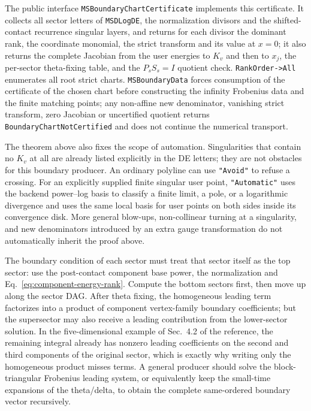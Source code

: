 \documentclass[11pt,a4paper]{article}
\begin{document}
The public interface \texttt{MSBoundaryChartCertificate} implements this certificate. It collects all sector letters of \texttt{MSDLogDE}, the normalization divisors and the shifted-contact recurrence singular layers, and returns for each divisor the dominant rank, the coordinate monomial, the strict transform and its value at $x=0$; it also returns the complete Jacobian from the user energies to $K_v$ and then to $x_j$, the per-sector theta-fixing table, and the $P_sS_s=I$ quotient check. \texttt{RankOrder->All} enumerates all root strict charts. \texttt{MSBoundaryData} forces consumption of the certificate of the chosen chart before constructing the infinity Frobenius data and the finite matching points; any non-affine new denominator, vanishing strict transform, zero Jacobian or uncertified quotient returns \texttt{BoundaryChartNotCertified} and does not continue the numerical transport.

The theorem above also fixes the scope of automation. Singularities that contain no $K_v$ at all are already listed explicitly in the DE letters; they are not obstacles for this boundary producer.  An ordinary polyline can use \texttt{"Avoid"} to refuse a crossing.  For an explicitly supplied finite singular user point, \texttt{"Automatic"} uses the backend power--log basis to classify a finite limit, a pole, or a logarithmic divergence and uses the same local basis for user points on both sides inside its convergence disk.  More general blow-ups, non-collinear turning at a singularity, and new denominators introduced by an extra gauge transformation do not automatically inherit the proof above.

The boundary condition of each sector must treat that sector itself as the top sector: use the post-contact component base power, the normalization and Eq.~\eqref{eq:component-energy-rank}. Compute the bottom sectors first, then move up along the sector DAG. After theta fixing, the homogeneous leading term factorizes into a product of component vertex-family boundary coefficients; but the supersector may also receive a leading contribution from the lower-sector solution. In the five-dimensional example of Sec.~4.2 of the reference, the remaining integral already has nonzero leading coefficients on the second and third components of the original sector, which is exactly why writing only the homogeneous product misses terms. A general producer should solve the block-triangular Frobenius leading system, or equivalently keep the small-time expansions of the theta/delta, to obtain the complete same-ordered boundary vector recursively.
\end{document}
